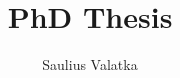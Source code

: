 \documentclass[a4paper]{article}
\begin{document}
\title{\bf PhD Thesis}

\author{Saulius Valatka}



\maketitle
\end{document}

